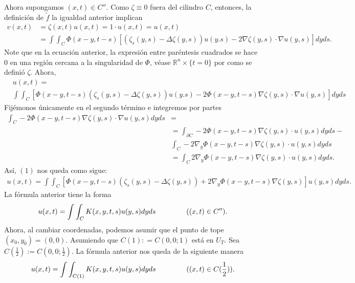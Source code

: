 \begin{homeworkProblem}
\begin{solucion}
    Ahora supongamos $(x,t) \in C''$. Como $\zeta \equiv 0$ fuera del cilindro $C$, entonces, la definición de $\tilde{f}$ la igualdad anterior implican
    \begin{align*}
      v(x,t) &= \zeta(x,t)u(x,t) = 1\cdot u(x,t) = u(x,t)\\ 
      &=\int \int_{C} \Phi(x-y,t-s) [(\zeta_{s}(y,s)- \Delta \zeta (y,s))u(y.s)- 2\nabla \zeta(y,s) \cdot \nabla u(y,s)]dyds.
    \end{align*}
    Note que en la ecuación anterior, la expresión entre paréntesis cuadrados se hace $0$ en una región cercana a la singularidad de $\Phi$, véase $\mathbb{R}^{n} \times \{t=0\}$ por como se definió $\zeta$. Ahora,
    \begin{align}
      & u(x,t) = \\ 
      & \int \int_{C} [\Phi(x-y,t-s) (\zeta_{s}(y,s)- \Delta \zeta (y,s))u(y.s) - 2\Phi(x-y,t-s) \nabla \zeta(y,s) \cdot \nabla u(y,s)]dyds
    \end{align}
    Fijémonos únicamente en el segundo término e integremos por partes
    \begin{align*}
      \int_{C} - 2\Phi(x-y,t-s) \nabla \zeta(y,s) \cdot \nabla u(y,s)dyds &=\\ 
      &= \int_{\partial C} -2 \Phi(x-y,t-s) \nabla \zeta(y,s) \cdot u(y,s)dyds -\\ 
      & \int_{C}-2 \nabla_{y} \Phi(x-y,t-s) \nabla \zeta(y,s) \cdot u(y,s)dyds\\ 
      & = \int_{C} 2 \nabla_{y} \Phi(x-y,t-s) \nabla \zeta(y,s) \cdot u(y,s)dyds.
    \end{align*}
    Así, $(1)$ nos queda como sigue:
    \begin{align*}
      u(x,t) = \int \int_{C} [\Phi(x-y,t-s) (\zeta_{s}(y,s)- \Delta \zeta (y,s)) + 2 \nabla_{y} \Phi(x-y,t-s) \nabla \zeta(y,s)]u(y,s)dyds.
    \end{align*}
    La fórmula anterior tiene la forma
    \begin{align*}
      u(x,t) = \int \int_{C} K(x,y,t,s)u(y,s)dyds \hspace{1.5cm} ((x,t) \in C'').
    \end{align*}
    Ahora, al cambiar coordenadas, podemos asumir que el punto de tope $(x_{0}, y_{0}) = (0,0)$. Asumiendo que $C(1) : = C(0,0;1)$ está en $U_{T}$. Sea $C(\frac{1}{2}):= C(0,0;\frac{1}{2})$. La fórmula anterior nos queda de la siguiente manera
    \begin{align*}
      u(x,t) = \int \int_{C(1)} K(x,y,t,s)u(y,s)dyds \hspace{1.5cm} ((x,t) \in C(\frac{1}{2})).

\end{align*}
\end{solucion}
\end{homeworkProblem}
